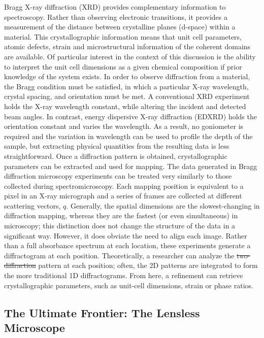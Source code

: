 \documentclass[journal=cmatex,manuscript=perspective]{achemso}
\providecommand{\DIFaddtex}[1]{{\protect\color{blue}\uwave{#1}}} %
\providecommand{\DIFdeltex}[1]{{\protect\color{red}\sout{#1}}}                      %
\providecommand{\DIFaddbegin}{} %
\providecommand{\DIFaddend}{} %
\providecommand{\DIFdelbegin}{} %
\providecommand{\DIFdelend}{} %
\providecommand{\DIFadd}[1]{\texorpdfstring{\DIFaddtex{#1}}{#1}} %
\providecommand{\DIFdel}[1]{\texorpdfstring{\DIFdeltex{#1}}{}} %
\begin{document}
Bragg X-ray diffraction (XRD) provides complementary information to
spectroscopy. Rather than observing electronic transitions, it
provides a measurement of the distance between crystalline planes
(d-space) within a material. This crystallographic information means
that unit cell parameters, atomic defects, strain and microstructural
information of the coherent domains are available. Of particular
interest in the context of this discussion is the ability to interpret
the unit cell dimensions as a given chemical composition if prior
knowledge of the system exists. In order to observe diffraction from a
material, the Bragg condition must be satisfied, in which a particular
X-ray wavelength, crystal spacing, and orientation must be met. A
conventional XRD experiment holds the X-ray wavelength constant, while
altering the incident and detected beam angles. In contrast, energy
dispersive X-ray diffraction (EDXRD) holds the orientation constant
and varies the wavelength. As a result, no goniometer is required and
the variation in wavelength can be used to profile the depth of the
sample, but extracting physical quantities from the resulting data is
less straightforward\cite{michel2005,strobridge2015}. Once a
diffraction pattern is obtained, crystallographic parameters can be
extracted and used for mapping. The data generated in Bragg
diffraction microscopy experiments can be treated very similarly to
those collected during spectromicroscopy. Each mapping position is
equivalent to a pixel in an X-ray micrograph and a series of frames
are collected at different scattering vectors, $q$. Generally, the
spatial dimensions are the slowest-changing in diffraction mapping,
whereas they are the fastest (or even simultaneous) in microscopy;
this distinction does not change the structure of the data in a
significant way. However, it does obviate the need to align each
image. Rather than a full absorbance spectrum at each location, these
experiments generate a diffractogram at each position. Theoretically,
a researcher can analyze the \DIFdelbegin \DIFdel{two-diffraction }\DIFdelend \DIFaddbegin \DIFadd{two-dimensional diffraction }\DIFaddend pattern at
each position; often, the 2D patterns are integrated to form the more
traditional 1D diffractograms. From here, a refinement can retrieve
crystallographic parameters, such as unit-cell dimensions, strain or
phase ratios.

\subsection{The Ultimate Frontier: The Lensless Microscope}
\end{document}
